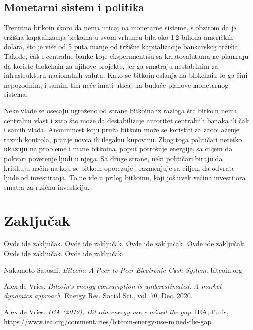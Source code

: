 \documentclass[a4paper]{article}
\begin{document}
\subsection{Monetarni sistem i politika}

Trenutno bitkoin skoro da nema uticaj na monetarne sisteme, s obzirom da je tržišna kapitalizacija bitkoina u svom vrhuncu bila oko 1.2 biliona američkih dolara, što je više od 5 puta manje od tržišne kapitalizacije bankarskog tržišta. Takođe, čak i centralne banke koje eksperimentišu sa kriptovalutama ne planiraju da koriste blokchain za njihove projekte, jer ga smatraju nestabilnim za infrastrukturu nacionalnih valuta. Kako se bitkoin oslanja na blokchain to ga čini nepogodnim, i samim tim neće imati uticaj na buduće planove monetarnog sistema.

Neke vlade se osećaju ugroženo od strane bitkoina iz razloga što bitkoin nema centralnu vlast i zato što može da destabilizuje autoritet centralnih banaka ili čak i samih vlada. Anonimnost koju pruža bitkoin može se koristiti za zaobilaženje raznih kontrola, pranje novca ili ilegalnu kupovinu. Zbog toga političari neretko ukazuju na probleme i mane bitkoina, poput potrošnje energije, sa ciljem da pokvari poverenje ljudi u njega. Sa druge strane, neki političari biraju da kritikuju način na koji se bitkoin oporezuje i razmenjuje sa ciljem da odvrate ljude od investiranja. To ne ide u prilog bitkoinu, koji još uvek većina investitora smatra za rizičnu investiciju.

\clearpage

\section{Zaključak}

Ovde ide zaključak.
Ovde ide zaključak.
Ovde ide zaključak.
Ovde ide zaključak.
Ovde ide zaključak.
Ovde ide zaključak.


\appendix

\begin{thebibliography}{9}

 Nakamoto Satoshi. \emph{Bitcoin: A Peer-to-Peer Electronic Cash System}. bitcoin.org

 Alex de Vries. \emph{Bitcoin’s energy consumption is underestimated: A market dynamics approach}. Energy Res. Social Sci., vol. 70, Dec. 2020.

 Alex de Vries. \emph{IEA (2019), Bitcoin energy use - mined the gap}.  IEA, Paris, https://www.iea.org/commentaries/bitcoin-energy-use-mined-the-gap 



\end{thebibliography}
\end{document}
